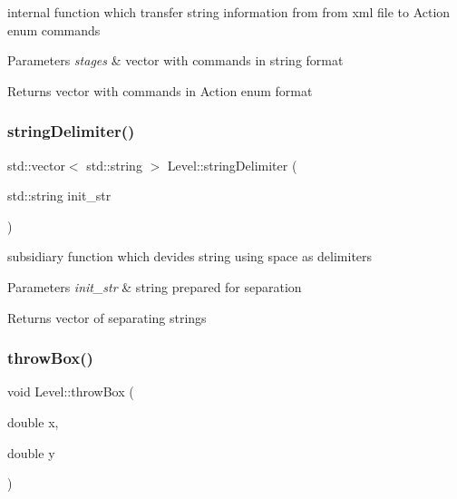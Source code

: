 internal function which transfer string information from from xml file to Action enum commands 


\begin{DoxyParams}{Parameters}
{\em stages} & vector with commands in string format \\
\hline
\end{DoxyParams}
\begin{DoxyReturn}{Returns}
vector with commands in Action enum format 
\end{DoxyReturn}
\mbox{\label{class_level_a6aecafb8e2e9a33178c9d18d100d7261}} 
\subsubsection{\texorpdfstring{string\+Delimiter()}{stringDelimiter()}}
{\footnotesize\ttfamily std\+::vector$<$ std\+::string $>$ Level\+::string\+Delimiter (\begin{DoxyParamCaption}\item[{std\+::string}]{init\+\_\+str }\end{DoxyParamCaption})\hspace{0.3cm}{\ttfamily [private]}}



subsidiary function which devides string using \textquotesingle{}space\textquotesingle{} as delimiters 


\begin{DoxyParams}{Parameters}
{\em init\+\_\+str} & string prepared for separation \\
\hline
\end{DoxyParams}
\begin{DoxyReturn}{Returns}
vector of separating strings 
\end{DoxyReturn}
\mbox{\label{class_level_a911bba94df90e7adabac1a5a0519ea47}} 
\subsubsection{\texorpdfstring{throw\+Box()}{throwBox()}}
{\footnotesize\ttfamily void Level\+::throw\+Box (\begin{DoxyParamCaption}\item[{double}]{x,  }\item[{double}]{y }\end{DoxyParamCaption})\hspace{0.3cm}{\ttfamily [private]}}



